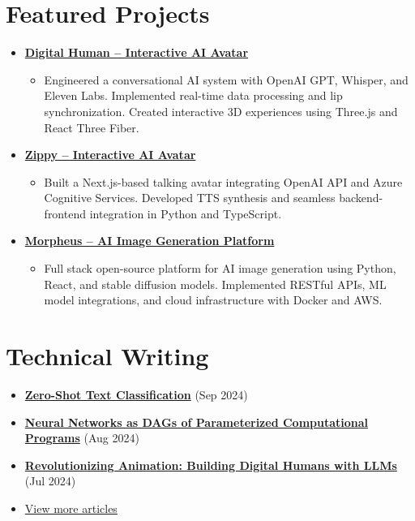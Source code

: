 \documentclass[letterpaper,11pt]{article}
\newcommand{\normalfaExternalLink}{{\mdseries\faExternalLink}}
\begin{document}
\section{Featured Projects}
\begin{itemize}[leftmargin=*, itemsep=1pt]
    \item \textbf{\href{https://github.com/asanchezyali/talking-avatar-with-ai}{Digital Human -- Interactive AI Avatar \normalfaExternalLink}}
    \begin{itemize}[itemsep=0pt]
        \item Engineered a conversational AI system with OpenAI GPT, Whisper, and Eleven Labs. Implemented real-time data processing and lip synchronization. Created interactive 3D experiences using Three.js and React Three Fiber.
    \end{itemize}
    \item \textbf{\href{https://github.com/asanchezyali/ai-avatar}{Zippy -- Interactive AI Avatar \normalfaExternalLink}}
    \begin{itemize}[itemsep=0pt]
        \item Built a Next.js-based talking avatar integrating OpenAI API and Azure Cognitive Services. Developed TTS synthesis and seamless backend-frontend integration in Python and TypeScript.
    \end{itemize}
    \item \textbf{\href{https://github.com/Monadical-SAS/Morpheus}{Morpheus -- AI Image Generation Platform \normalfaExternalLink}}
    \begin{itemize}[itemsep=0pt]
        \item Full stack open-source platform for AI image generation using Python, React, and stable diffusion models. Implemented RESTful APIs, ML model integrations, and cloud infrastructure with Docker and AWS.
    \end{itemize}
\end{itemize}

\section{Technical Writing}
\begin{itemize}[leftmargin=*, itemsep=0pt]
    \item \textbf{\href{https://www.asanchezyali.com/blog/en/ai/20240917ZeroShot}{Zero-Shot Text Classification}} (Sep 2024)
    \item \textbf{\href{https://www.asanchezyali.com/blog/en/differentiable-programming/20240923DifferentiablePrograms}{Neural Networks as DAGs of Parameterized Computational Programs}} (Aug 2024)
    \item \textbf{\href{https://www.asanchezyali.com/blog/ai-avatars/20240703DigitalHuman}{Revolutionizing Animation: Building Digital Humans with LLMs}} (Jul 2024)
    \item \href{https://www.asanchezyali.com/}{View more articles \normalfaExternalLink}
\end{itemize}
\end{document}
